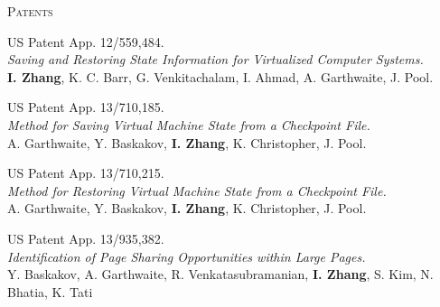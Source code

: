 \documentclass[10pt,times]{report}
\newlength{\sectiongap}
\newlength{\sectioncolwidth}
\newlength{\colgap}
\newlength{\stuffwidth}
\newenvironment{rtable}{
  \begin{minipage}{\textwidth}
  }{
  \end{minipage}
}
\newenvironment{rsection}[1]{
  \begin{minipage}[t]{\sectioncolwidth}
    \textsc{#1}
  \end{minipage}
  \hspace{\colgap}
  \begin{minipage}[t]{\stuffwidth}
  }{
    \removelastskip
  \end{minipage}
  \\[\sectiongap]
}
\begin{document}
\begin{rtable}
  \begin{rsection}{Patents}
    US Patent App. 12/559,484.\\
    \textit{Saving and Restoring State Information for Virtualized Computer Systems.}\\
    \textbf{I. Zhang}, K. C. Barr, G. Venkitachalam, I. Ahmad, A. Garthwaite, J. Pool.\\\vspace{-0.5em}

    US Patent App. 13/710,185.\\
    \textit{Method for Saving Virtual Machine State from a Checkpoint
    File.}\\
    A. Garthwaite, Y. Baskakov, \textbf{I. Zhang}, K. Christopher,
    J. Pool.\\\vspace{-0.5em}

    US Patent App. 13/710,215.\\
    \textit{Method for Restoring Virtual Machine State from a Checkpoint
    File.}\\
    A. Garthwaite, Y. Baskakov, \textbf{I. Zhang}, K. Christopher,
    J. Pool.\\\vspace{-0.5em}
    
    US Patent App. 13/935,382.\\
    \textit{Identification of Page Sharing Opportunities within Large
      Pages.}\\
    Y. Baskakov, A. Garthwaite, R. Venkatasubramanian, \textbf{I. Zhang}, S. Kim, N. Bhatia, K. Tati\\
  \end{rsection}


\end{rtable}
\end{document}
